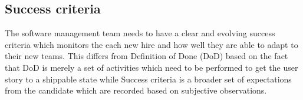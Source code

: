 \documentclass[10pt,conference]{IEEEtran}
\begin{document}
\subsection*{Success criteria} The software management team needs to have a clear and evolving success criteria which monitors the each new hire and how well they are able to adapt to their new teams. This differs from Definition of Done (DoD) based on the fact that DoD is merely a set of activities which need to be performed to get the user story to a shippable state while Success criteria is a broader set of expectations from the candidate which are recorded based on subjective observations. 








\end{document}
